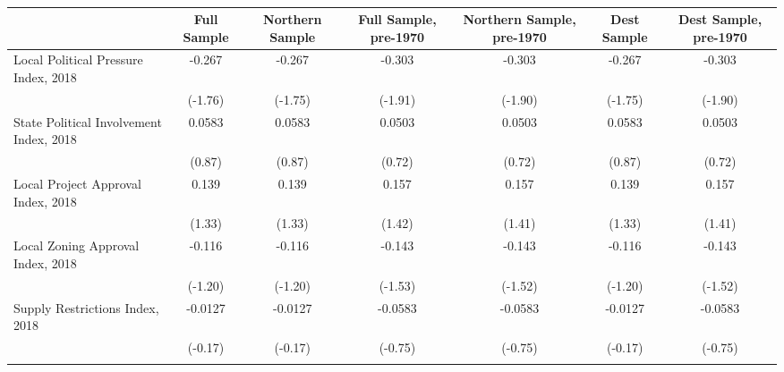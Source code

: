 \begin{table}[htbp]\centering
\def\sym#1{\ifmmode^{#1}\else\(^{#1}\)\fi}
\caption{ \label{tab1}}
\begin{tabular}{l*{6}{c}}
\toprule
                    &\multicolumn{1}{c}{Full Sample}&\multicolumn{1}{c}{Northern Sample}&\multicolumn{1}{c}{Full Sample, pre-1970}&\multicolumn{1}{c}{Northern Sample, pre-1970}&\multicolumn{1}{c}{Dest Sample}&\multicolumn{1}{c}{Dest Sample, pre-1970}\\
\midrule
Local Political Pressure Index, 2018&      -0.267         &      -0.267         &      -0.303         &      -0.303         &      -0.267         &      -0.303         \\
                    &     (-1.76)         &     (-1.75)         &     (-1.91)         &     (-1.90)         &     (-1.75)         &     (-1.90)         \\
\addlinespace
State Political Involvement Index, 2018&      0.0583         &      0.0583         &      0.0503         &      0.0503         &      0.0583         &      0.0503         \\
                    &      (0.87)         &      (0.87)         &      (0.72)         &      (0.72)         &      (0.87)         &      (0.72)         \\
\addlinespace
Local Project Approval Index, 2018&       0.139         &       0.139         &       0.157         &       0.157         &       0.139         &       0.157         \\
                    &      (1.33)         &      (1.33)         &      (1.42)         &      (1.41)         &      (1.33)         &      (1.41)         \\
\addlinespace
Local Zoning Approval Index, 2018&      -0.116         &      -0.116         &      -0.143         &      -0.143         &      -0.116         &      -0.143         \\
                    &     (-1.20)         &     (-1.20)         &     (-1.53)         &     (-1.52)         &     (-1.20)         &     (-1.52)         \\
\addlinespace
Supply Restrictions Index, 2018&     -0.0127         &     -0.0127         &     -0.0583         &     -0.0583         &     -0.0127         &     -0.0583         \\
                    &     (-0.17)         &     (-0.17)         &     (-0.75)         &     (-0.75)         &     (-0.17)         &     (-0.75)         \\
\addlinespace

\end{tabular}
\end{table}
